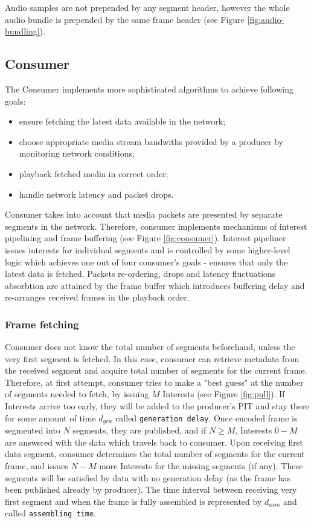\documentclass{icn/sig-alternate-2012} %
\begin{document}
Audio samples are not prepended by any segment header, however the whole audio bundle is prepended by the same frame header (see Figure \ref{fig:audio-bundling}).

\subsection{Consumer}

The Consumer implements more sophisticated algorithms to achieve following goals:
\begin{itemize}
\item ensure fetching the latest data available in the network; 
\item choose appropriate media stream bandwiths provided by a producer by monitoring network conditions;
\item playback fetched media in correct order;
\item handle network latency and packet drops.
\end{itemize}

Consumer takes into account that media packets are presented by separate segments in the network. Therefore, consumer implements mechanisms of interest pipelining and frame buffering (see Figure \ref{fig:consumer}). Interest pipeliner issues interests for individual segments and is controlled by some higher-level logic which achieves one out of four consumer's goals - ensures that only the latest data is fetched. Packets re-ordering, drops and latency fluctuations absorbtion are attained by the frame buffer which introduces buffering delay and re-arranges received frames in the playback order.



\subsubsection{Frame fetching}

Consumer does not know the total number of segments beforehand, unless the very first segment is fetched. In this case, consumer can retrieve metadata from the received segment and acquire total number of segments for the current frame. 
Therefore, at first attempt, consumer tries to make a "best guess" at the number of segments needed to fetch, by issuing $M$ Interests (see Figure \ref{fig:pull}). If Interests arrive too early, they will be added to the producer's PIT and stay there for some amount of time $d_{gen}$ called \texttt{generation delay}. Once encoded frame is segmented into $N$ segments, they are published, and if $N\geq M$, Interests $0 - M$ are answered with the data which travels back to consumer. Upon receiving first data segment, consumer determines the total number of segments for the current frame, and issues $N - M$ more Interests for the missing segments (if any). These segments will be satisfied by data with no generation delay (as the frame has been published already by producer). The time interval between receiving very first segment and when the frame is fully assembled is represented by $d_{asm}$ and called \texttt{assembling time}.
\end{document}
